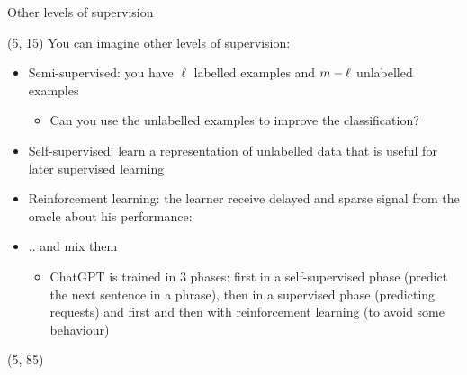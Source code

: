 \begin{frame}{Other levels of supervision}
  \note{
    \begin{itemize}
    \item
    \end{itemize}
  }

  \begin{textblock}{90}(5, 15)
    You can imagine other levels of supervision:
    \begin{itemize}
    \item<2-> Semi-supervised: you have $\ell$ labelled examples and
      $m - \ell$ unlabelled examples
      \begin{itemize}
      \item Can you use the unlabelled examples to improve the classification?
      \end{itemize}
    \item<3-> Self-supervised: learn a representation of unlabelled data that is
      useful for later supervised learning
    \item<4-> Reinforcement learning: the learner receive delayed and sparse signal
      from the oracle about his performance:
    \item<5-> .. and mix them
      \begin{itemize}
      \item ChatGPT is trained in 3 phases: first in a self-supervised phase
        (predict the next sentence in a phrase),
        then in a supervised phase (predicting requests) and first and then with
        reinforcement learning (to avoid some behaviour)
      \end{itemize}
    \end{itemize}
  \end{textblock}

  \begin{textblock}{90}(5, 85)
  \end{textblock}
\end{frame}


